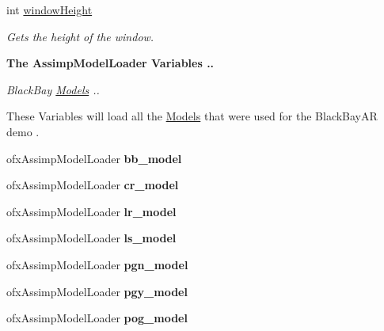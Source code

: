 \begin{DoxyCompactItemize}
\item 
int \hyperlink{group___int_variables_ga31efaa85f8a900bb659a537d56c73e03}{window\-Height}
\begin{DoxyCompactList}\small\item\em Gets the height of the window. \end{DoxyCompactList}\end{DoxyCompactItemize}
\begin{Indent}{\bf The Assimp\-Model\-Loader Variables ..}\par
{\em Black\-Bay \hyperlink{class_models}{Models} ..

These Variables will load all the \hyperlink{class_models}{Models} that were used for the Black\-Bay\-A\-R demo . }\begin{DoxyCompactItemize}
\item 
\hypertarget{group___int_variables_ga55051db1203331adb5556373b1f93194}{ofx\-Assimp\-Model\-Loader {\bfseries bb\-\_\-model}}\label{group___int_variables_ga55051db1203331adb5556373b1f93194}

\item 
\hypertarget{group___int_variables_ga0226f29cac900da4a7d1a698b1b5b9d3}{ofx\-Assimp\-Model\-Loader {\bfseries cr\-\_\-model}}\label{group___int_variables_ga0226f29cac900da4a7d1a698b1b5b9d3}

\item 
\hypertarget{group___int_variables_ga75d1f2c61d9e27b0f639a2632de94ed0}{ofx\-Assimp\-Model\-Loader {\bfseries lr\-\_\-model}}\label{group___int_variables_ga75d1f2c61d9e27b0f639a2632de94ed0}

\item 
\hypertarget{group___int_variables_gab7fc48fde55ff01601e7ec704685fda7}{ofx\-Assimp\-Model\-Loader {\bfseries ls\-\_\-model}}\label{group___int_variables_gab7fc48fde55ff01601e7ec704685fda7}

\item 
\hypertarget{group___int_variables_ga80f171a105bccdb3e505d438462d089a}{ofx\-Assimp\-Model\-Loader {\bfseries pgn\-\_\-model}}\label{group___int_variables_ga80f171a105bccdb3e505d438462d089a}

\item 
\hypertarget{group___int_variables_gaf98c6967c563936d418bf048a7d392b7}{ofx\-Assimp\-Model\-Loader {\bfseries pgy\-\_\-model}}\label{group___int_variables_gaf98c6967c563936d418bf048a7d392b7}

\item 
\hypertarget{group___int_variables_ga28a2622b1304d4096d4fefc1a46759b3}{ofx\-Assimp\-Model\-Loader {\bfseries pog\-\_\-model}}\label{group___int_variables_ga28a2622b1304d4096d4fefc1a46759b3}


\end{DoxyCompactItemize}
\end{Indent}
